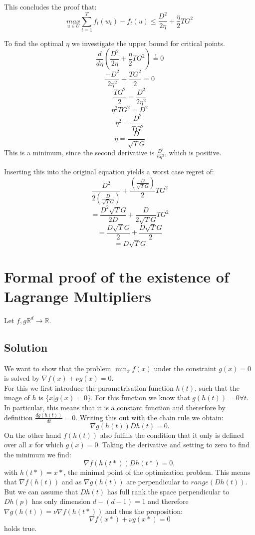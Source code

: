 \documentclass[10pt]{article}
\numberwithin{equation}{section}
\begin{document}
\begin{enumerate}
{This concludes the proof that:
$$\underset{u \in U}{max} \sum_{t=1}^T f_t(w_t) - f_t(u) \leq  \frac{D^2}{2\eta} + \frac{\eta}{2} T G^2$$

\item[d)]{
    To find the optimal $\eta$ we investigate the upper bound for critical points.
    $$ \frac{d}{d \eta} \left( \frac{D^2}{2\eta} + \frac{\eta}{2} T G^2\right)  \overset{!}{=} 0$$
    $$\frac{-D^2}{2\eta^2} + \frac{TG^2}{2} = 0 $$
    $$\frac{TG^2}{2} = \frac{D^2}{2\eta^2}  $$
    $$\eta^2TG^2 = D^2$$
    $$\eta^2 = \frac{D^2}{TG^2}$$
    $$\eta = \frac{D}{\sqrt{T}G}$$
    This is a minimum, since the second derivative is $\frac{D^2}{6\eta^3}$, which is positive.

    Inserting this into the original equation yields a worst case regret of:
    $$\frac{D^2}{2\left(\frac{D}{\sqrt{T}{G}}\right)} + \frac{\left(\frac{D}{\sqrt{T}G}\right)}{2} T G^2$$
    $$=\frac{D^2\sqrt{T}G}{2D} + \frac{D}{2\sqrt{T}G} T G^2$$
    $$=\frac{D\sqrt{T}G}{2} + \frac{D\sqrt{T}G}{2}$$
    $$=D\sqrt{T}G$$
  }
    


}
\end{enumerate}
\section*{Formal proof of the existence of Lagrange Multipliers}
Let $f, g \mathbb{R}^d \to \mathbb{R}$. 
\subsection*{Solution}
We want to show that the problem $\min_x f(x)$ under the constraint $g(x)=0$ is solved by $\nabla f(x) + \nu g(x) =0$. \\
For this we first introduce the parametrisation function $h(t)$, such that the image of $h$ is $\{x|g(x) = 0\}$. 
For this function we know that $g(h(t)) = 0 \forall t$. In particular, this means that it is a constant function and thererfore by definition $\frac{dg(h(t))}{dt} = 0$. Writing this out with the chain rule we obtain:
$$
\nabla g(h(t)) Dh(t) = 0.
$$
On the other hand $f(h(t))$ also fulfills the condition that it only is defined over all $x$ for which $g(x)=0$. Taking the derivative and setting to zero to find the minimum we find:
$$
\nabla f(h(t*)) Dh(t*) = 0,
$$
with $h(t*) = x*$, the minimal point of the optimization problem. 
This means that $\nabla f(h(t))$ and as $\nabla g(h(t))$ are perpendicular to $range(Dh(t))$. But we can assume that $Dh(t)$ has full rank the space perpendicular to $Dh(p)$ has only dimension $d-(d-1) = 1$ and therefore $\nabla g(h(t)) = \nu \nabla f(h(t*))$ and thus the proposition:
$$
\nabla f(x*) + \nu g(x*) =0
$$
holds true. 
\end{document}
